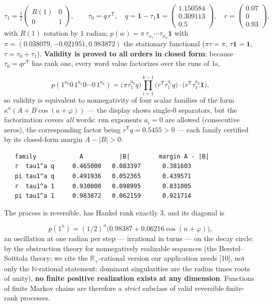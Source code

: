 \documentclass[11pt]{article}
\begin{document}
\[
\tau_1 = \tfrac12\begin{pmatrix} R(1) & 0\\ 0 & 1\end{pmatrix},
\qquad
\tau_0 = q\,r^{\mathsf T},\quad
q = \mathbf 1 - \tau_1\mathbf 1 =
\begin{pmatrix}1.150584\\ 0.309113\\ 0.5\end{pmatrix},\quad
r = \begin{pmatrix}0.07\\ 0\\ 0.93\end{pmatrix},
\]
with $R(1)$ rotation by $1$ radian; $p(w) = \pi\,\tau_{x_1}\cdots \tau_{x_n}\mathbf 1$ with $\pi = (0.038079, -0.021951, 0.983872)$ the stationary functional ($\pi\tau = \pi$, $\tau\mathbf 1 = \mathbf 1$, $\tau = \tau_0 + \tau_1$).  \textbf{Validity is proved to all orders in closed form}: because $\tau_0 = q r^{\mathsf T}$ has rank one, every word value factorizes over the runs of $1$s,

\[
p(1^{a_0}0\,1^{a_1}0\cdots 0\,1^{a_k})
= \bigl(\pi\tau_1^{a_0}q\bigr)
  \prod_{i=1}^{k-1}\bigl(r^{\mathsf T}\tau_1^{a_i}q\bigr)
  \cdot\bigl(r^{\mathsf T}\tau_1^{a_k}\mathbf 1\bigr),
\]
so validity is equivalent to nonnegativity of four scalar families of the form $\kappa^a(A + B\cos(a + \varphi))$ — the display shows single-$0$ separators, but the factorization covers \emph{all} words: run exponents $a_i = 0$ are allowed (consecutive zeros), the corresponding factor being $r^{\mathsf T} q = 0.5455 > 0$ — each family certified by its closed-form margin $A - |B| > 0$:

\begin{small}\begin{verbatim}
   family            A          |B|        margin A - |B|
   r  tau1^a q     0.465000   0.083397      0.381603
   pi tau1^a q     0.491936   0.052365      0.439571
   r  tau1^a 1     0.930000   0.098995      0.831005
   pi tau1^a 1     0.983872   0.062159      0.921714
\end{verbatim}\end{small}
The process is reversible, has Hankel rank exactly $3$, and its diagonal is

\[
p(1^n) = (1/2)^{n}\bigl(0.98387 + 0.06216\cos(n + \varphi)\bigr),
\]
an oscillation at one radian per step — irrational in turns — on the decay circle: by the obstruction theory for nonnegatively realizable sequences (the Berstel–Soittola theory; we cite the $\mathbb R_+$-rational version our application needs [10], not only the $\mathbb N$-rational statement: dominant singularities are the radius times roots of unity), \textbf{no finite positive realization exists at any dimension}. Functions of finite Markov chains are therefore a \emph{strict} subclass of valid reversible finite-rank processes.
\end{document}
